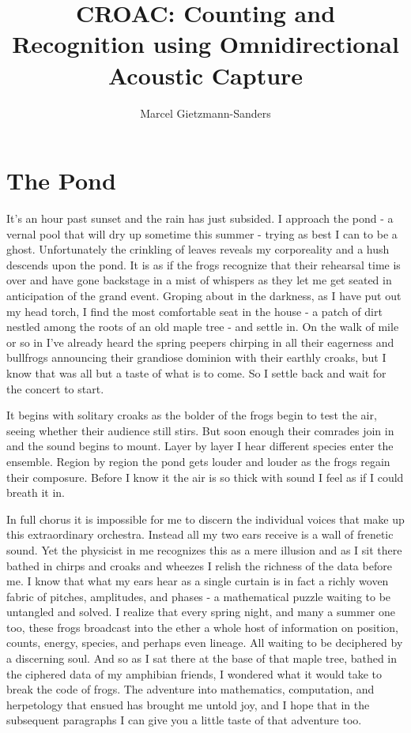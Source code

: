\documentclass[10pt,a5paper]{book}
\title{CROAC: Counting and Recognition using Omnidirectional Acoustic Capture}
\author{Marcel Gietzmann-Sanders}
\begin{document}
\maketitle
\tableofcontents
\newpage
\chapter{The Pond}
It's an hour past sunset and the rain has just subsided. I approach the pond - a vernal pool that will dry up sometime this summer - trying as best I can to be a ghost. Unfortunately the crinkling of leaves reveals my corporeality and a hush descends upon the pond. It is as if the frogs recognize that their rehearsal time is over and have gone backstage in a mist of whispers as they let me get seated in anticipation of the grand event. Groping about in the darkness, as I have put out my head torch, I find the most comfortable seat in the house - a patch of dirt nestled among the roots of an old maple tree - and settle in. On the walk of mile or so in I've already heard the spring peepers chirping in all their eagerness and bullfrogs announcing their grandiose dominion with their earthly croaks, but I know that was all but a taste of what is to come. So I settle back  and wait for the concert to start.

It begins with solitary croaks as the bolder of the frogs begin to test the air, seeing whether their audience still stirs. But soon enough their comrades join in and the sound begins to mount. Layer by layer I hear different species enter the ensemble. Region by region the pond gets louder and louder as the frogs regain their composure. Before I know it the air is so thick with sound I feel as if I could breath it in. 

In full chorus it is impossible for me to discern the individual voices that make up this extraordinary orchestra. Instead all my two ears receive is a wall of frenetic sound. Yet the physicist in me recognizes this as a mere illusion and as I sit there bathed in chirps and croaks and wheezes I relish the richness of the data before me. I know that what my ears hear as a single curtain is in fact a richly woven fabric of pitches, amplitudes, and phases - a mathematical puzzle waiting to be untangled and solved. I realize that every spring night, and many a summer one too, these frogs broadcast into the ether a whole host of information on position, counts, energy, species, and perhaps even lineage. All waiting to be deciphered by a discerning soul. And so as I sat there at the base of that maple tree, bathed in the ciphered data of my amphibian friends, I wondered what it would take to break the code of frogs. The adventure into mathematics, computation, and herpetology that ensued has brought me untold joy, and I hope that in the subsequent paragraphs I can give you a little taste of that adventure too. 
\newpage
\end{document}
